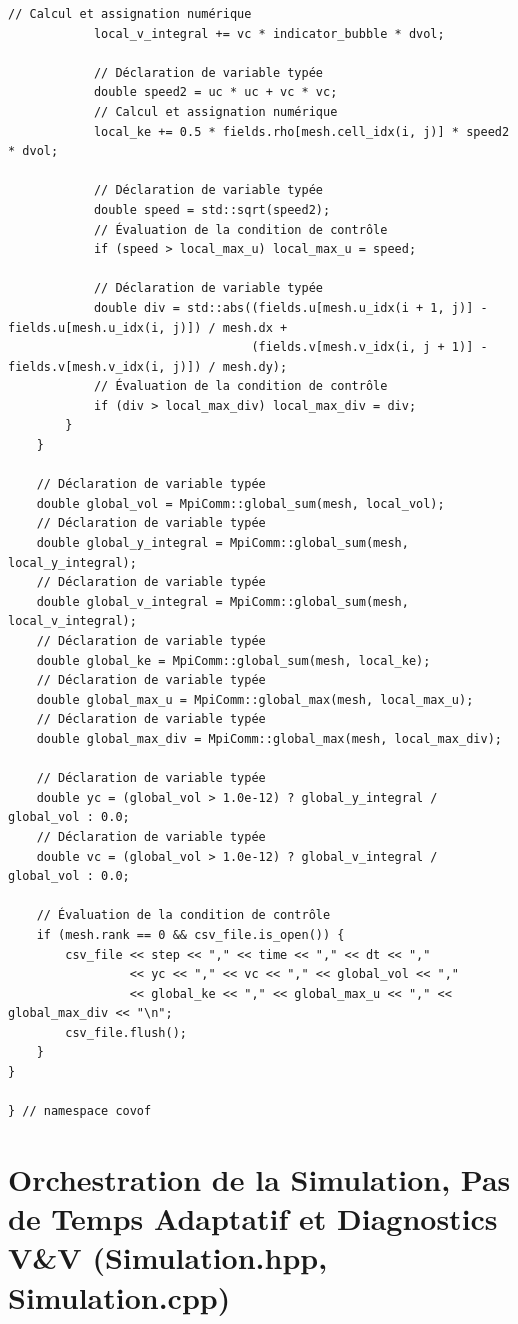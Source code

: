 \documentclass[10pt,a4paper,oneside]{book}
\begin{document}
\begin{lstlisting}[language={[11]C++}]
            // Calcul et assignation numérique
            local_v_integral += vc * indicator_bubble * dvol;

            // Déclaration de variable typée
            double speed2 = uc * uc + vc * vc;
            // Calcul et assignation numérique
            local_ke += 0.5 * fields.rho[mesh.cell_idx(i, j)] * speed2 * dvol;

            // Déclaration de variable typée
            double speed = std::sqrt(speed2);
            // Évaluation de la condition de contrôle
            if (speed > local_max_u) local_max_u = speed;

            // Déclaration de variable typée
            double div = std::abs((fields.u[mesh.u_idx(i + 1, j)] - fields.u[mesh.u_idx(i, j)]) / mesh.dx +
                                  (fields.v[mesh.v_idx(i, j + 1)] - fields.v[mesh.v_idx(i, j)]) / mesh.dy);
            // Évaluation de la condition de contrôle
            if (div > local_max_div) local_max_div = div;
        }
    }

    // Déclaration de variable typée
    double global_vol = MpiComm::global_sum(mesh, local_vol);
    // Déclaration de variable typée
    double global_y_integral = MpiComm::global_sum(mesh, local_y_integral);
    // Déclaration de variable typée
    double global_v_integral = MpiComm::global_sum(mesh, local_v_integral);
    // Déclaration de variable typée
    double global_ke = MpiComm::global_sum(mesh, local_ke);
    // Déclaration de variable typée
    double global_max_u = MpiComm::global_max(mesh, local_max_u);
    // Déclaration de variable typée
    double global_max_div = MpiComm::global_max(mesh, local_max_div);

    // Déclaration de variable typée
    double yc = (global_vol > 1.0e-12) ? global_y_integral / global_vol : 0.0;
    // Déclaration de variable typée
    double vc = (global_vol > 1.0e-12) ? global_v_integral / global_vol : 0.0;

    // Évaluation de la condition de contrôle
    if (mesh.rank == 0 && csv_file.is_open()) {
        csv_file << step << "," << time << "," << dt << ","
                 << yc << "," << vc << "," << global_vol << ","
                 << global_ke << "," << global_max_u << "," << global_max_div << "\n";
        csv_file.flush();
    }
}

} // namespace covof

\end{lstlisting}

\chapter{Orchestration de la Simulation, Pas de Temps Adaptatif et Diagnostics V&V (Simulation.hpp, Simulation.cpp)}
\end{document}

